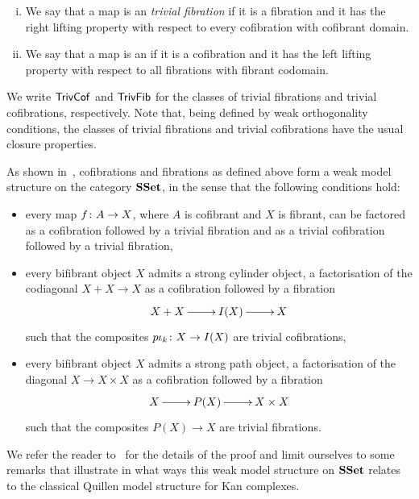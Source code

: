 \documentclass[reqno,10pt,a4paper,oneside,draft]{amsart}
\begin{document}
\begin{definition} \label{def:trivfib-trivcof} \hfill
\begin{enumerate}[(i)]
\item We say that a map is an \emph{trivial fibration} if it is a fibration and it has the right lifting property
with respect to every cofibration with cofibrant domain.
\item We say that a map is an  if it is a cofibration and it has the left lifting property with respect to all fibrations with fibrant codomain.
\end{enumerate}
\end{definition}

We write $\mathsf{TrivCof}$ and $\mathsf{TrivFib}$ for the classes of trivial fibrations and trivial cofibrations, respectively.
Note that, being defined by weak orthogonality conditions, the classes of trivial fibrations
and trivial cofibrations have the usual closure properties. 

\bigskip




\bigskip

As shown in~\cite[Corollary~5.3.2]{henry2018wms}, cofibrations and fibrations as defined above form  a weak model structure on the category $\mathbf{SSet}$, in the sense that the following conditions hold:
\begin{itemize}
\item every map $f \colon A \to X$, where $A$ is cofibrant and $X$ is fibrant, can be factored as a
cofibration followed by a trivial fibration  and as a trivial cofibration followed by a trivial fibration,
\item every bifibrant object $X$ admits a strong cylinder object, \ie  a factorisation of the codiagonal $ X + X \to X$ as a cofibration followed by a fibration 
\[
\xymatrix{X + X \ar[r] &  I(X) \ar[r] & X }
\]
such that the composites $p  \iota_k \colon X \to I(X)$ are trivial cofibrations,
\item every bifibrant object $X$ admits a strong path object, \ie a factorisation of the diagonal 
$X \to X \times X$ as a cofibration followed by a fibration
\[
\xymatrix{X  \ar[r]  & P(X) \ar[r] & X \times X  }
 \]
 such that the composites $P(X) \to X$ are trivial fibrations.
\end{itemize}


\medskip

We refer the reader to~\cite{henry2018wms} for the details of the proof and limit ourselves to some remarks that illustrate in what ways this weak model structure on $\mathbf{SSet}$ relates to the classical Quillen model structure for Kan complexes. 
\end{document}
